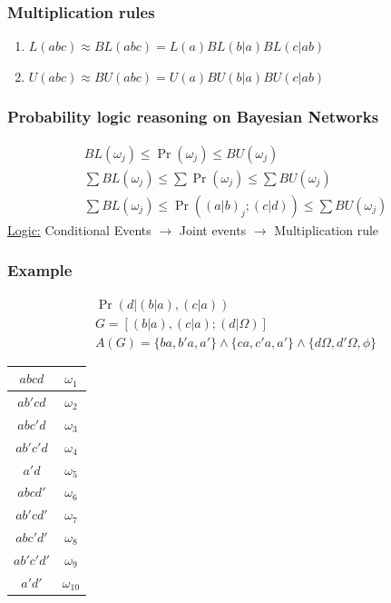 \documentclass{beamer}
\providecommand{\pr}[1]{\ensuremath{\Pr\left(#1\right)}}
\begin{document}
\begin{frame}
    \frametitle{Multiplication rules}
    \begin{enumerate}
        \item $L(abc) \approx BL(abc) = L(a)BL(b|a)BL(c|ab)$
        \newline 
        \item $U(abc) \approx BU(abc) = U(a)BU(b|a)BU(c|ab)$
    \end{enumerate}
\end{frame}

\begin{frame}
    \frametitle{Probability logic reasoning on Bayesian Networks}
    \begin{align}
        BL(\omega_j) \leq \pr{\omega_j} \leq BU(\omega_j)\\
         \sum BL(\omega_j) \leq  \sum \pr{\omega_j} \leq \sum BU(\omega_j)\\
         \sum BL(\omega_j) \leq \pr{(a|b)_j;(c|d)} \leq \sum BU(\omega_j)
    \end{align}
    \underline{Logic:}
    Conditional Events $\longrightarrow$ Joint events $\longrightarrow$ Multiplication rule 
\end{frame}
\begin{frame}
    \frametitle{Example}
    \begin{align}
        \pr{d|(b|a),(c|a)} \\
        G = [(b|a), (c|a) ; (d|\Omega)]\\
        A(G) = \{ba,b'a,a'\} \wedge \{ca,c'a,a'\} \wedge \{d\Omega , d'\Omega , \phi\}
\end{align}
\begin{center}
    \begin{tabular}{|c|c|}
\hline
     $abcd$ & $\omega_1$  \\
     \hline
     $ab'cd$ & $\omega_2$  \\
     \hline
      $abc'd$ & $\omega_3$  \\
     \hline
      $ab'c'd$ & $\omega_4$  \\
     \hline
      $a'd$ & $\omega_5$  \\
     \hline
      $abcd'$ & $\omega_6$  \\
     \hline
      $ab'cd'$ & $\omega_7$  \\
     \hline
      $abc'd'$ & $\omega_8$  \\
     \hline
      $ab'c'd'$ & $\omega_9$  \\
     \hline
      $a'd'$ & $\omega_{10}$  \\
     \hline
\end{tabular}
\end{center}
\end{frame}
\end{document}
